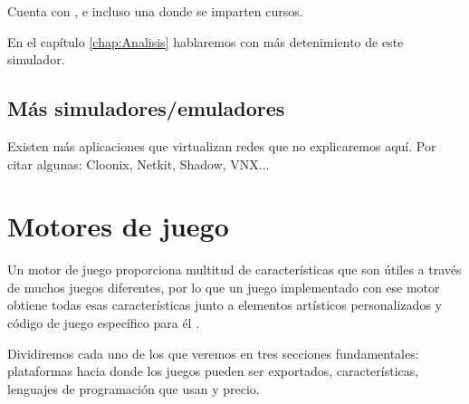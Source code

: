 Cuenta con ,  e incluso una  donde se imparten cursos.  

En el capítulo \ref{chap:Analisis} hablaremos con más detenimiento de este simulador.

\subsection{Más simuladores/emuladores}
Existen más aplicaciones que virtualizan redes que no explicaremos aquí. Por citar algunas: Cloonix, Netkit, Shadow, VNX...


\section{Motores de juego}
Un motor de juego proporciona multitud de características que son útiles a través de muchos juegos diferentes, por lo que un juego implementado con ese motor obtiene todas esas características junto a elementos artísticos personalizados y código de juego específico para él \cite{unityinaction}. 

Dividiremos cada uno de los que veremos en tres secciones fundamentales: plataformas hacia donde los juegos pueden ser exportados, características, lenguajes de programación que usan y precio.

